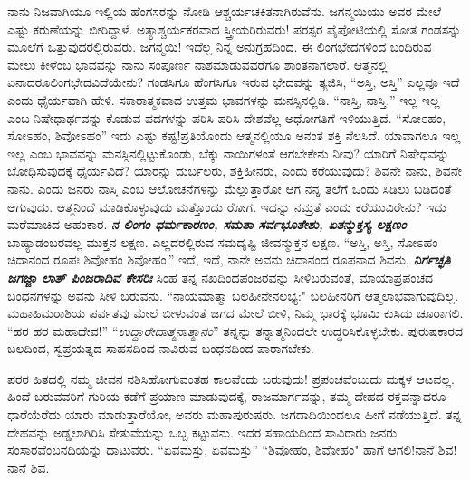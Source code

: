 ನಾನು ನಿಜವಾಗಿಯೂ ಇಲ್ಲಿಯ ಹೆಂಗಸರನ್ನು ನೋಡಿ ಆಶ್ಚರ್ಯಚಕಿತನಾಗಿರುವೆನು. ಜಗನ್ಮಯಿಯು ಅವರ ಮೇಲೆ ಎಷ್ಟು ಕರುಣೆಯನ್ನು ಬೀರಿದ್ದಾಳೆ. ಅತ್ಯಾಶ್ಚರ್ಯಕರವಾದ ಸ್ತ್ರೀಯರಿರುವರು! ಪರಸ್ಪರ ಪೈಪೋಟಿಯಲ್ಲಿ ಸೋತ ಗಂಡಸನ್ನು ಮೂಲೆಗೆ ಒತ್ತುವುದರಲ್ಲಿರುವರು. ಜಗನ್ಮಯಿ! ಇದೆಲ್ಲ ನಿನ್ನ ಅನುಗ್ರಹದಿಂದ. ಈ ಲಿಂಗಭೇದಗಳಿಂದ ಬಂದಿರುವ ಮೇಲು ಕೀಳೆಂಬ ಭಾವವನ್ನು ನಾನು ಸಂಪೂರ್ಣ ನಾಶಮಾಡುವವರೆಗೂ ಶಾಂತನಾಗಲಾರೆ. ಆತ್ಮನಲ್ಲಿ ಏನಾದರೂಲಿಂಗಭೇದವಿದೆಯೇನು? ಗಂಡಸಿಗೂ ಹೆಂಗಸಿಗೂ ಇರುವ ಭೇದವನ್ನು ತ್ಯಜಿಸಿ, “ಅಸ್ತಿ, ಅಸ್ತಿ” ಎಲ್ಲವೂ ಇದೆ ಎಂದು ಧೈರ್ಯವಾಗಿ ಹೇಳಿ. ಸಕಾರಾತ್ಮಕವಾದ ಉತ್ತಮ ಭಾವಗಳನ್ನು ಮನಸ್ಸಿನಲ್ಲಿಡಿ. “ನಾಸ್ತಿ, ನಾಸ್ತಿ,” ಇಲ್ಲ ಇಲ್ಲ ಎಂಬ ನಿಷೇಧಾರ್ಥವನ್ನು ಕೊಡುವ ಪದಗಳನ್ನು ಪಠಿಸಿ ಪಠಿಸಿ ದೇಶವೆಲ್ಲ ಅಧೋಗತಿಗೆ ಇಳಿಯುತ್ತಿದೆ. “ಸೋಽಹಂ, ಸೋಽಹಂ, ಶಿವೋಽಹಂ” ಇದು ಎಷ್ಟು ಕಷ್ಟ!ಪ್ರತಿಯೊಂದು ಆತ್ಮನಲ್ಲಿಯೂ ಅನಂತ ಶಕ್ತಿ ನೆಲಸಿದೆ. ಯಾವಾಗಲೂ ಇಲ್ಲ ಇಲ್ಲ ಎಂಬ ಭಾವವನ್ನು ಮನಸ್ಸಿನಲ್ಲಿಟ್ಟುಕೊಂಡು, ಬೆಕ್ಕು ನಾಯಿಗಳಂತೆ ಆಗಬೇಕೇನು ನೀವು? ಯಾರಿಗೆ ನಿಷೇಧವನ್ನು ಬೋಧಿಸುವುದಕ್ಕೆ ಧೈರ್ಯವಿದೆ? ಯಾರನ್ನು ದುರ್ಬಲರು, ಶಕ್ತಿಹೀನರು, ಎಂದು ಕರೆಯುವುದು? ಶಿವನೇ ನಾನು, ಶಿವನೇ ನಾನು. ಎಂದು ಜನರು ನಾಸ್ತಿ ಎಂಬ ಆಲೋಚನೆಗಳನ್ನು ಮೆಲ್ಲುತ್ತಾರೋ ಆಗ ನನ್ನ ತಲೆಗೆ ಒಂದು ಸಿಡಿಲು ಬಡಿದಂತೆ ಆಗುವುದು. ಆತ್ಮನಿಂದೆ ಮಾಡಿಕೊಳ್ಳುವುದು ಮತ್ತೊಂದು ರೋಗ. ಇದನ್ನು ನಮ್ರತೆ ಎಂದು ಕರೆಯುವಿರೇನು? ಇದು ಮರೆಮಾಚಿದ ಅಹಂಕಾರ. \textbf{\textit{ನ ಲಿಂಗಂ ಧರ್ಮಕಾರಣಂ, ಸಮತಾ ಸರ್ವಭೂತೇಶು, ಏತನ್ಮುಕ್ತಸ್ಯ ಲಕ್ಷಣಂ}} ಬಾಹ್ಯಾಡಂಬರವಲ್ಲ ಮುಕ್ತನ ಲಕ್ಷಣ. ಎಲ್ಲದರಲ್ಲಿರುವ ಸಮದೃಷ್ಟಿ ಜೀವನ್ಮುಕ್ತನ ಲಕ್ಷಣ. “ಅಸ್ತಿ, ಅಸ್ತಿ, ಸೋಽಹಂ ಚಿದಾನಂದ ರೂಪಃ ಶಿವೋಹಂ ಶಿವೋಹಂ.'' ಇದೆ, ಇದೆ, ನಾನೇ ಅವನು ಚಿದಾನಂದ ರೂಪನಾದ ಶಿವನು, \textbf{\textit{ನಿರ್ಗಚ್ಛತಿ ಜಗಜ್ಜಾ ಲಾತ್ ಪಿಂಜರಾದಿವ ಕೇಸರಿಃ}} \enginline{-} ಸಿಂಹ ತನ್ನ ನಖದಿಂದಪಂಜರವನ್ನು ಸೀಳಿಬರುವಂತೆ, ಮಾಯಾಪ್ರಪಂಚದ ಬಂಧನಗಳನ್ನು ಅವನು ಸೀಳಿ ಬರುವನು. ``ನಾಯಮಾತ್ಮಾ ಬಲಹೀನೇನಲಭ್ಯ:" ಬಲಹೀನರಿಗೆ ಆತ್ಮಲಾಭವಾಗುವುದಿಲ್ಲ. ಮಹಾಹಿಮರಾಶಿಯ ಪರ್ವತವು ಮೇಲೆ ಬೀಳುವಂತೆ ಜಗದ ಮೇಲೆ ಬೀಳಿ, ನಿಮ್ಮ ಭಾರಕ್ಕೆ ಭೂಮಿ ಕುಸಿದು ಚೂರಾಗಲಿ. ``ಹರ ಹರ ಮಹಾದೇವ!'' “\textit{ಉದ್ದಾರೇದಾತ್ಮನಾತ್ಮಾನಂ}'' ತನ್ನನ್ನು ತನ್ನಾತ್ಮನಿಂದಲೇ ಉದ್ಧರಿಸಿಕೊಳ್ಳಬೇಕು. ಪುರುಷಕಾರದ ಬಲದಿಂದ, ಸ್ವಪ್ರಯತ್ನದ ಸಾಹಸದಿಂದ ನಾವಿರುವ ಬಂಧನದಿಂದ ಪಾರಾಗಬೇಕು.

ಪರರ ಹಿತದಲ್ಲಿ ನಮ್ಮ ಜೀವನ ನಶಿಸಿಹೋಗುವಂತಹ ಕಾಲವೆಂದು ಬರುವುದು! ಪ್ರಪಂಚವೆಂಬುದು ಮಕ್ಕಳ ಆಟವಲ್ಲ. ಹಿಂದೆ ಬರುವವರಿಗೆ ಗುರಿಯ ಕಡೆಗೆ ಪ್ರಯಾಣ ಮಾಡುವುದಕ್ಕೆ, ರಾಜಮಾರ್ಗವನ್ನು, ತಮ್ಮ ದೇಹದ ರಕ್ತವನ್ನಾದರೂ ಧಾರೆಯೆರೆದು ಯಾರು ಮಾಡುತ್ತಾರೆಯೋ, ಅವರು ಮಹಾಪುರುಷರು. ಜಗದಾದಿಯಿಂದಲೂ ಹೀಗೆ ನಡೆಯುತ್ತಿದೆ. ತನ್ನ ದೇಹವನ್ನು ಅಡ್ಡಲಾಗಿರಿಸಿ ಸೇತುವೆಯನ್ನು ಒಬ್ಬ ಕಟ್ಟುವನು. ಇದರ ಸಹಾಯದಿಂದ ಸಾವಿರಾರು ಜನರು ಸಂಸಾರವೆಂಬನದಿಯನ್ನು ದಾಟುವರು. “ಏವಮಸ್ತು, ಏವಮಸ್ತು'' ``ಶಿವೋಹಂ, ಶಿವೋಹಂ" ಹಾಗೆ ಆಗಲಿ!ನಾನೆ ಶಿವ! ನಾನೆ ಶಿವ.

